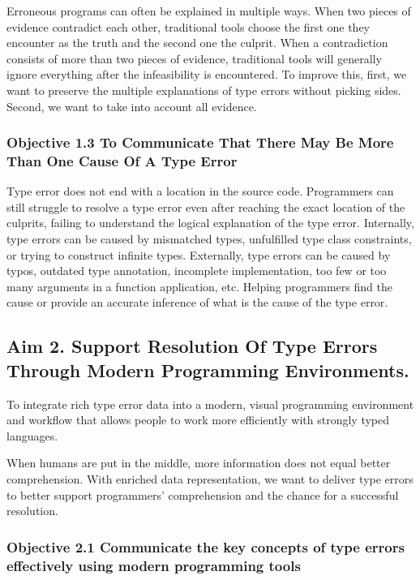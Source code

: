 Erroneous programs can often be explained in multiple ways. When two pieces of evidence contradict each other, traditional tools choose the first one they encounter as the truth and the second one the culprit. When a contradiction consists of more than two pieces of evidence, traditional tools will generally ignore everything after the infeasibility is encountered. To improve this, first, we want to preserve the multiple explanations of type errors without picking sides. Second, we want to take into account all evidence.

\subsubsection{Objective 1.3 To Communicate That There May Be More Than One Cause Of A Type Error}

Type error does not end with a location in the source code. Programmers can still struggle to resolve a type error even after reaching the exact location of the culprits, failing to understand the logical explanation of the type error. Internally, type errors can be caused by mismatched types, unfulfilled type class constraints, or trying to construct infinite types. Externally, type errors can be caused by typos, outdated type annotation, incomplete implementation, too few or too many arguments in a function application, etc. Helping programmers find the cause or provide an accurate inference of what is the cause of the type error.

\subsection{Aim 2. Support Resolution Of Type Errors Through Modern Programming Environments.}

To integrate rich type error data into a modern, visual programming environment and workflow that allows people to work more efficiently with strongly typed languages.


When humans are put in the middle, more information does not equal better comprehension. With enriched data representation, we want to deliver type errors to better support programmers’ comprehension and the chance for a successful resolution.

\subsubsection{Objective 2.1 Communicate the key concepts of type errors effectively using modern programming tools}

